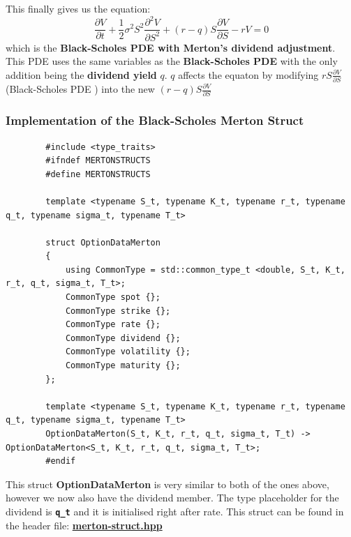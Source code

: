 \documentclass[12pt]{article}
\numberwithin{equation}{section}
\begin{document}
This finally gives us the equation:
   \begin{equation} 
	\boxed{\frac{\partial V}{\partial t} + \frac{1}{2} \sigma^2 S^2 \frac{\partial^2 V}{\partial S^2} + (r-q)S\frac{\partial V}{\partial S} - rV = 0 }
\end{equation}
which is the \textbf{Black-Scholes PDE with Merton's dividend adjustment}.  \cite{buchanan2014ExtensionsBS} \newline \newline
This PDE uses the same variables as the \textbf{Black-Scholes PDE} with the only addition being the \textbf{dividend yield} $q$. $q$ affects the equaton by modifying $rS\frac{\partial V}{\partial S}$ (Black-Scholes PDE ) into the new $(r-q)S\frac{\partial V}{\partial S}$
\subsubsection{Implementation of the Black-Scholes Merton Struct}

\begin{listing}[H]
	\begin{verbatim}
		#include <type_traits>
		#ifndef MERTONSTRUCTS
		#define MERTONSTRUCTS
		
		template <typename S_t, typename K_t, typename r_t, typename q_t, typename sigma_t, typename T_t>
		
		struct OptionDataMerton
		{
			using CommonType = std::common_type_t <double, S_t, K_t, r_t, q_t, sigma_t, T_t>;
			CommonType spot {};
			CommonType strike {};
			CommonType rate {};
			CommonType dividend {};
			CommonType volatility {};
			CommonType maturity {};
		};
		
		template <typename S_t, typename K_t, typename r_t, typename q_t, typename sigma_t, typename T_t>
		OptionDataMerton(S_t, K_t, r_t, q_t, sigma_t, T_t) -> OptionDataMerton<S_t, K_t, r_t, q_t, sigma_t, T_t>;
		#endif
	\end{verbatim}
\caption{Black--Scholes Merton Option Data Struct}
\label{lst:merton-struct}
\end{listing}
\FloatBarrier
This struct \textbf{OptionDataMerton} is very similar to both of the ones above, however we now also have the dividend member. The type placeholder for the dividend is \textbf{\texttt{q\_t}} and it is initialised right after rate. This struct can be found in the header file: \href{https://github.com/neeldevsen/pricingengines/blob/main/I%3A%20European%20Options/Headers/merton_struct.hpp}{\textbf{merton-struct.hpp}}
\end{document}
